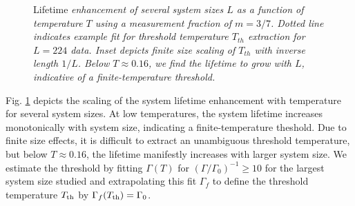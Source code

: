 \documentclass[twocolumn,superscriptaddress,aps,prb,floatfix]{revtex4-1}
\newcommand{\figref}[1]{Fig. \ref{#1}}
\begin{document}
\begin{figure}
\begin{center}
\end{center}
\caption{Lifetime \it{enhancement} of several system sizes $L$ as a function of temperature $T$ using a measurement fraction of $m=3/7$.  Dotted line indicates example fit for threshold temperature $T_{th}$ extraction for $L=224$ data.  Inset depicts finite size scaling of $T_{th}$ with inverse length $1/L$.  Below $T\approx0.16$, we find the lifetime to grow with $L$, indicative of a finite-temperature threshold.}
\label{fig:LifetimeVsTemperature}
\end{figure}

\figref{fig:LifetimeVsTemperature} depicts the scaling of the system lifetime enhancement with temperature for several system sizes.  At low temperatures, the system lifetime increases monotonically with system size, indicating a finite-temperature theshold.  Due to finite size effects, it is difficult to extract an unambiguous threshold temperature, but below $T\approx0.16$, the lifetime manifestly increases with larger system size.  We estimate the threshold by fitting $\Gamma(T)$ for $(\Gamma/\Gamma_0)^{-1} \geq 10$ for the largest system size studied and extrapolating this fit $\Gamma_f$ to define the threshold temperature $T_{\rm{th}}$ by $\Gamma_f(T_{\rm{th}}) = \Gamma_0$.
\end{document}
